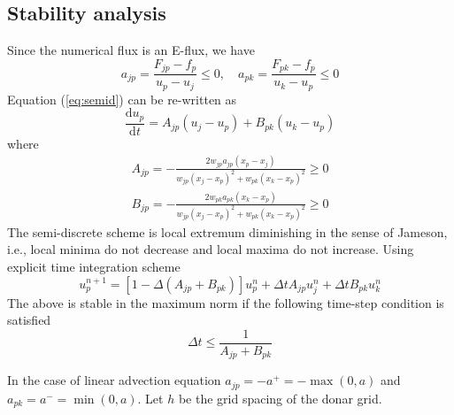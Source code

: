 \documentclass[11pt]{amsart}
\newcommand{\ud}{\textrm{d}}
\newcommand{\dd}[2]{\frac{ \ud #1 }{ \ud #2 }}
\begin{document}
\subsection{Stability analysis}
Since the numerical flux is an E-flux, we have
\begin{equation}
a_{jp} = \frac{ F_{jp} - f_p }{u_p - u_j} \le 0, \quad a_{pk} = \frac{ F_{pk} - f_p }{u_k - u_p} \le 0
\end{equation}
Equation (\ref{eq:semid}) can be re-written as
\begin{equation}
\dd{u_p}{t} = A_{jp} (u_j - u_p) + B_{pk} (u_k - u_p)
\label{eq:semid2}
\end{equation}
where
\begin{eqnarray*}
A_{jp} = - \frac{2 w_{jp} a_{jp} (x_p - x_j)}{ w_{jp} (x_j - x_p)^2 + w_{pk} (x_k - x_p)^2 } \ge 0 \\
B_{jp} = - \frac{2 w_{pk} a_{pk} (x_k - x_p)}{ w_{jp} (x_j - x_p)^2 + w_{pk} (x_k - x_p)^2 } \ge 0
\end{eqnarray*}
The semi-discrete scheme is local extremum diminishing in the sense of Jameson, i.e., local minima do not decrease and local maxima do not increase. Using explicit time integration scheme
\begin{equation*}
u^{n+1}_p = [1 - \Delta (A_{jp} + B_{pk})] u^n_p + \Delta t A_{jp} u^n_j + \Delta t B_{pk} u^n_k
\end{equation*}
The above is stable in the maximum norm if the following time-step condition is satisfied
\begin{equation}
\Delta t \le \frac{1}{A_{jp} + B_{pk}}
\end{equation}

In the case of linear advection equation $a_{jp} = -a^+ = -\max(0,a)$ and $a_{pk} = a^- = \min(0,a)$. Let $h$ be the grid spacing of the donar grid.
\end{document}
